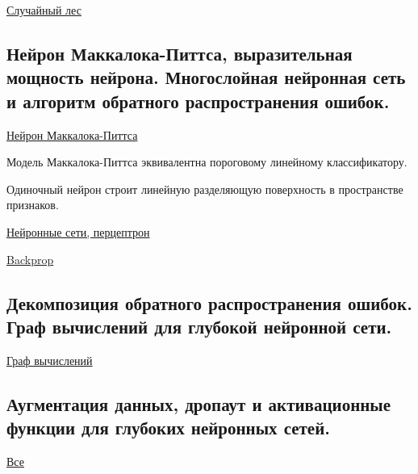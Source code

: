 \documentclass{article}
\begin{document}
\href{
	https://neerc.ifmo.ru/wiki/index.php?title=%
}{Случайный лес}


\subsection{Нейрон Маккалока-Питтса, выразительная мощность нейрона. Многослойная
нейронная сеть и алгоритм обратного распространения ошибок.}

\href{http://www.machinelearning.ru/wiki/index.php?title=%D0%9C%D0%BE%D0%B4%D0%B5%D0%BB%D1%8C_%D0%9C%D0%B0%D0%BA%D0%9A%D0%B0%D0%BB%D0%BB%D0%BE%D0%BA%D0%B0-%D0%9F%D0%B8%D1%82%D1%82%D1%81%D0%B0}{Нейрон Маккалока-Питтса}

Модель Маккалока-Питтса эквивалентна пороговому линейному классификатору.

Одиночный нейрон строит линейную разделяющую поверхность в пространстве
признаков.

\href{https://neerc.ifmo.ru/wiki/index.php?title=%D0%9D%D0%B5%D0%B9%D1%80%D0%BE%D0%BD%D0%BD%D1%8B%D0%B5_%D1%81%D0%B5%D1%82%D0%B8,_%D0%BF%D0%B5%D1%80%D1%86%D0%B5%D0%BF%D1%82%D1%80%D0%BE%D0%BD}{Нейронные сети, перцептрон}

\href{https://neerc.ifmo.ru/wiki/index.php?title=%D0%9E%D0%B1%D1%80%D0%B0%D1%82%D0%BD%D0%BE%D0%B5_%D1%80%D0%B0%D1%81%D0%BF%D1%80%D0%BE%D1%81%D1%82%D1%80%D0%B0%D0%BD%D0%B5%D0%BD%D0%B8%D0%B5_%D0%BE%D1%88%D0%B8%D0%B1%D0%BA%D0%B8}{Backprop}


\subsection{Декомпозиция обратного распространения ошибок. Граф вычислений для
глубокой нейронной сети.}

\href{https://neerc.ifmo.ru/wiki/index.php?title=%D0%9D%D0%B0%D1%81%D1%82%D1%80%D0%BE%D0%B9%D0%BA%D0%B0_%D0%B3%D0%BB%D1%83%D0%B1%D0%BE%D0%BA%D0%BE%D0%B9_%D1%81%D0%B5%D1%82%D0%B8}{Граф вычислений}


\subsection{Аугментация данных, дропаут и активационные функции для глубоких нейронных
сетей.}

\href{https://neerc.ifmo.ru/wiki/index.php?title=%D0%9F%D1%80%D0%B0%D0%BA%D1%82%D0%B8%D0%BA%D0%B8_%D1%80%D0%B5%D0%B0%D0%BB%D0%B8%D0%B7%D0%B0%D1%86%D0%B8%D0%B8_%D0%BD%D0%B5%D0%B9%D1%80%D0%BE%D0%BD%D0%BD%D1%8B%D1%85_%D1%81%D0%B5%D1%82%D0%B5%D0%B9}{Все}
\end{document}
